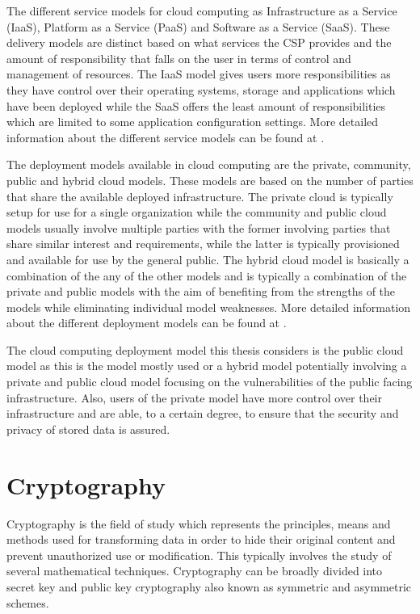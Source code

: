 The different service models for cloud computing as Infrastructure as a Service (IaaS), Platform as a Service (PaaS) and Software as a Service (SaaS). These delivery models are distinct based on what services the CSP provides and the amount of responsibility that falls on the user in terms of control and management of resources. The IaaS model gives users more responsibilities as they have control over their operating systems, storage and applications which have been deployed while the SaaS offers the least amount of responsibilities which are limited to some application configuration settings. More detailed information about the different service models can be found at \cite{nist}.

The deployment models available in cloud computing are the private, community, public and hybrid cloud models. These models are based on the number of parties that share the available deployed infrastructure. The private cloud is typically setup for use for a single organization while the community and public cloud models usually involve multiple parties with the former involving parties that share similar interest and requirements, while the latter is typically provisioned and available for use by the general public. The hybrid cloud model is basically a combination of the any of the other models and is typically a combination of the private and public models with the aim of benefiting from the strengths of the models while eliminating individual model weaknesses. More detailed information about the different deployment models can be found at \cite{nist}.

The cloud computing deployment model this thesis considers is the public cloud model as this is the model mostly used or a hybrid model potentially involving a private and public cloud model focusing on the vulnerabilities of the public facing infrastructure. Also, users of the private model have more control over their infrastructure and are able, to a certain degree, to ensure that the security and privacy of stored data is assured.


\section{Cryptography}

Cryptography\cite{Kissel2013} is the field of study which represents the principles, means and methods used for transforming data in order to hide their original content and prevent unauthorized use or modification. This typically involves the study of several mathematical techniques. Cryptography can be broadly divided into secret key and public key cryptography also known as symmetric and asymmetric schemes.


